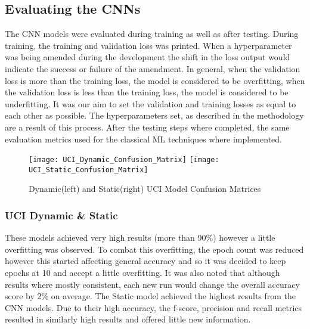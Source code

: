 \subsection{Evaluating the CNNs}
The CNN models were evaluated during training as well as after testing.
During training, the training and validation loss was printed.
When a hyperparameter was being amended during the development the shift in the loss output would indicate the success or failure of the amendment.
In general, when the validation loss is more than the training loss, the model is considered to be overfitting, when the validation loss is less than the training loss, the model is considered to be underfitting.
It was our aim to set the validation and training losses as equal to each other as possible.
The hyperparameters set, as described in the methodology are a result of this process.
After the testing steps where completed, the same evaluation metrics used for the classical ML techniques where implemented.

\begin{figure}[h]
\centering
\texttt{[image: UCI\_Dynamic\_Confusion\_Matrix]}\hfill
\texttt{[image: UCI\_Static\_Confusion\_Matrix]}\hfill
\caption{Dynamic(left) and Static(right) UCI Model Confusion Matrices}
\label{fig:UCI_Confusions}
\end{figure}

\subsubsection{UCI Dynamic \& Static}
These models achieved very high results (more than 90\%) however a little overfitting was observed.
To combat this overfitting, the epoch count was reduced however this started affecting general accuracy and so it was decided to keep epochs at 10 and accept a little overfitting.
It was also noted that although results where mostly consistent, each new run would change the overall accuracy score by 2\% on average.
The Static model achieved the highest results from the CNN models.
Due to their high accuracy, the f-score, precision and recall metrics resulted in similarly high results and offered little new information.


